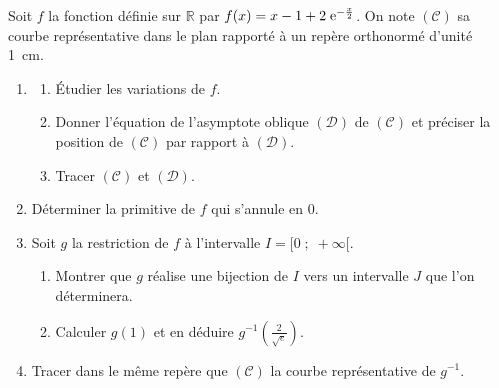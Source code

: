 \begin{exo}
Soit $f$ la fonction d\'efinie sur $\mathbb{R}$ par $f(x) = x - 1 + 2 \; \mathrm{e}^{-\frac{x}{2}}$.
On note $(\mathscr{C})$ sa courbe repr\'esentative dans le plan rapport\'e \`a un
rep\`ere orthonorm\'e \Oij{} d'unit\'e 1~cm.
\begin{enumerate}
\item \begin{enumerate}
      \item \'Etudier les variations de $f$.
      \item Donner l'\'equation de l'asymptote oblique $(\mathcal{D})$ de $(\mathscr{C})$ et 
      pr\'eciser la position de $(\mathscr{C})$ par rapport \`a $(\mathcal{D})$.
      \item Tracer $(\mathscr{C})$ et $(\mathcal{D})$.
      \end{enumerate}
\item D\'eterminer la primitive de $f$ qui s'annule en $0$.
\item Soit $g$ la restriction de $f$ \`a l'intervalle $I = [0 \; ; \; +\infty[$.
      \begin{enumerate}
      \item Montrer que $g$ r\'ealise une bijection de $I$ vers un intervalle $J$ que l'on d\'eterminera.
      \item Calculer $g(1)$ et en d\'eduire $g^{-1} \left( \frac{2}{\sqrt{e}} \right) $.
      \end{enumerate}
\item Tracer dans le m\^eme rep\`ere que $(\mathscr{C})$ la courbe repr\'esentative de $g^{-1}$.
\end{enumerate}
\end{exo}
